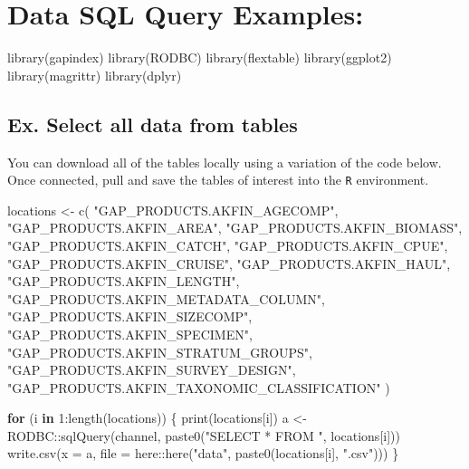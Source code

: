 \documentclass[
  letterpaper,
  oneside,
  open=any]{scrbook}
\newenvironment{Shaded}{\begin{snugshade}}{\end{snugshade}}
\newcommand{\AttributeTok}[1]{\textcolor[rgb]{0.40,0.45,0.13}{#1}}
\newcommand{\ControlFlowTok}[1]{\textcolor[rgb]{0.00,0.23,0.31}{\textbf{#1}}}
\newcommand{\DecValTok}[1]{\textcolor[rgb]{0.68,0.00,0.00}{#1}}
\newcommand{\FunctionTok}[1]{\textcolor[rgb]{0.28,0.35,0.67}{#1}}
\newcommand{\NormalTok}[1]{\textcolor[rgb]{0.00,0.23,0.31}{#1}}
\newcommand{\OtherTok}[1]{\textcolor[rgb]{0.00,0.23,0.31}{#1}}
\newcommand{\SpecialCharTok}[1]{\textcolor[rgb]{0.37,0.37,0.37}{#1}}
\newcommand{\StringTok}[1]{\textcolor[rgb]{0.13,0.47,0.30}{#1}}
\begin{document}
\section*{Data SQL Query Examples:}\label{data-sql-query-examples}


\begin{Shaded}
\begin{Highlighting}[]
\FunctionTok{library}\NormalTok{(gapindex)}
\FunctionTok{library}\NormalTok{(RODBC)}
\FunctionTok{library}\NormalTok{(flextable)}
\FunctionTok{library}\NormalTok{(ggplot2)}
\FunctionTok{library}\NormalTok{(magrittr)}
\FunctionTok{library}\NormalTok{(dplyr)}
\end{Highlighting}
\end{Shaded}

\subsection{Ex. Select all data from
tables}\label{ex.-select-all-data-from-tables}

You can download all of the tables locally using a variation of the code
below. Once connected, pull and save the tables of interest into the
\texttt{R} environment.

\begin{Shaded}
\begin{Highlighting}[]
\NormalTok{locations }\OtherTok{\textless{}{-}} \FunctionTok{c}\NormalTok{(}
  \StringTok{"GAP\_PRODUCTS.AKFIN\_AGECOMP"}\NormalTok{, }
  \StringTok{"GAP\_PRODUCTS.AKFIN\_AREA"}\NormalTok{, }
  \StringTok{"GAP\_PRODUCTS.AKFIN\_BIOMASS"}\NormalTok{, }
  \StringTok{"GAP\_PRODUCTS.AKFIN\_CATCH"}\NormalTok{, }
  \StringTok{"GAP\_PRODUCTS.AKFIN\_CPUE"}\NormalTok{, }
  \StringTok{"GAP\_PRODUCTS.AKFIN\_CRUISE"}\NormalTok{, }
  \StringTok{"GAP\_PRODUCTS.AKFIN\_HAUL"}\NormalTok{, }
  \StringTok{"GAP\_PRODUCTS.AKFIN\_LENGTH"}\NormalTok{, }
  \StringTok{"GAP\_PRODUCTS.AKFIN\_METADATA\_COLUMN"}\NormalTok{, }
  \StringTok{"GAP\_PRODUCTS.AKFIN\_SIZECOMP"}\NormalTok{, }
  \StringTok{"GAP\_PRODUCTS.AKFIN\_SPECIMEN"}\NormalTok{, }
  \StringTok{"GAP\_PRODUCTS.AKFIN\_STRATUM\_GROUPS"}\NormalTok{, }
  \StringTok{"GAP\_PRODUCTS.AKFIN\_SURVEY\_DESIGN"}\NormalTok{, }
  \StringTok{"GAP\_PRODUCTS.AKFIN\_TAXONOMIC\_CLASSIFICATION"}
\NormalTok{)}

\ControlFlowTok{for}\NormalTok{ (i }\ControlFlowTok{in} \DecValTok{1}\SpecialCharTok{:}\FunctionTok{length}\NormalTok{(locations)) \{}
  \FunctionTok{print}\NormalTok{(locations[i])}
\NormalTok{  a }\OtherTok{\textless{}{-}}\NormalTok{ RODBC}\SpecialCharTok{::}\FunctionTok{sqlQuery}\NormalTok{(channel, }\FunctionTok{paste0}\NormalTok{(}\StringTok{"SELECT * FROM "}\NormalTok{, locations[i]))}
  \FunctionTok{write.csv}\NormalTok{(}\AttributeTok{x =}\NormalTok{ a, }\AttributeTok{file =}\NormalTok{ here}\SpecialCharTok{::}\FunctionTok{here}\NormalTok{(}\StringTok{"data"}\NormalTok{, }\FunctionTok{paste0}\NormalTok{(locations[i], }\StringTok{".csv"}\NormalTok{)))}
\NormalTok{\}}
\end{Highlighting}
\end{Shaded}
\end{document}

